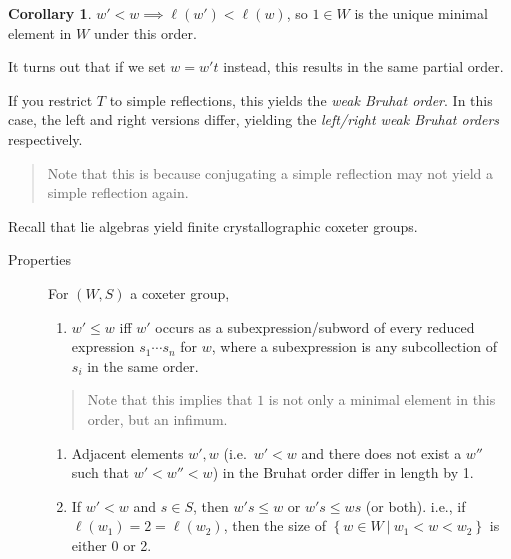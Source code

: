 \documentclass[11pt]{scrartcl}
\theoremstyle{definition}
\theoremstyle{theorem}
\newtheorem{corollary}[theorem]{Corollary}
\theoremstyle{proof}
\theoremstyle{definition}
\theoremstyle{break}
\theoremstyle{problem}
\providecommand{\tightlist}{%
  \setlength{\itemsep}{0pt}\setlength{\parskip}{0pt}}
\newcommand{\suchthat}[0]{{~\mathrel{\Big|}~}}
\newcommand{\theset}[1]{\left\{{#1}\right\}}
\begin{document}
\begin{corollary}

\(w' < w \implies \ell(w') < \ell(w)\), so \(1\in W\) is the unique
minimal element in \(W\) under this order.\end{corollary}

It turns out that if we set \(w = w' t\) instead, this results in the
same partial order.

If you restrict \(T\) to simple reflections, this yields the \emph{weak
Bruhat order}. In this case, the left and right versions differ,
yielding the \emph{left/right weak Bruhat orders} respectively.

\begin{quote}
Note that this is because conjugating a simple reflection may not yield
a simple reflection again.
\end{quote}

Recall that lie algebras yield finite crystallographic coxeter groups.

\begin{description}
\item[Properties]
For \((W, S)\) a coxeter group,

\begin{enumerate}
\def\labelenumi{\alph{enumi}.}
\tightlist
\item
  \(w' \leq w\) iff \(w'\) occurs as a subexpression/subword of every
  reduced expression \(s_1 \cdots s_n\) for \(w\), where a subexpression
  is any subcollection of \(s_i\) in the same order.
\end{enumerate}

\begin{quote}
Note that this implies that \(1\) is not only a minimal element in this
order, but an infimum.
\end{quote}

\begin{enumerate}
\def\labelenumi{\alph{enumi}.}
\setcounter{enumi}{1}
\item
  Adjacent elements \(w', w\) (i.e.~\(w' < w\) and there does not exist
  a \(w''\) such that \(w' < w'' < w\)) in the Bruhat order differ in
  length by 1.
\item
  If \(w' < w\) and \(s\in S\), then \(w' s \leq w\) or \(w's \leq ws\)
  (or both). i.e., if \(\ell(w_1) = 2 = \ell(w_2)\), then the size of
  \(\theset{w\in W \suchthat w_1 < w < w_2}\) is either 0 or 2.
\end{enumerate}

\begin{center}
\end{center}
\end{description}
\end{document}
